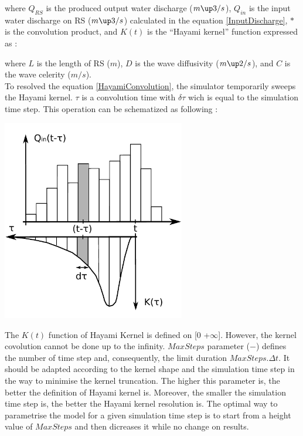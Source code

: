 

where $Q_{RS}$ is the produced output water discharge ($m\up3/s$), $Q_{in}$ is the input water discharge on RS ($m\up3/s$) calculated in the equation \ref{InputDischarge}, $*$ is the convolution product, and $K(t)$ is the ``Hayami kernel'' function expressed as :



where $L$ is the length of RS ($m$), $D$ is the wave diffusivity ($m\up2/s$), and $C$ is the wave celerity ($m/s$).\\

To resolved the equation \ref{HayamiConvolution}, the simulator temporarily sweeps the Hayami kernel. $\tau$ is a convolution time with $\delta \tau$ wich is equal to the simulation time step. This operation can be schematized as following :

\includegraphics[width=8cm]{doc/common/Convolution_HayamiRS.pdf}

The $K(t)$ function of Hayami Kernel is defined on [0 +$\infty$]. However, the kernel covolution cannot be done up to the infinity. $MaxSteps$ parameter ($-$) defines the number of time step and, consequently, the limit duration $MaxSteps . \Delta t$. It should be adapted according to the kernel shape and the simulation time step in the way to minimise the kernel truncation. The higher this parameter is, the better the definition of Hayami kernel is. Moreover, the smaller the simulation time step is, the better the Hayami kernel resolution is. The optimal way to parametrise the model for a given simulation time step is to start from a height value of $MaxSteps$ and then dicreases it while no change on results.\\

